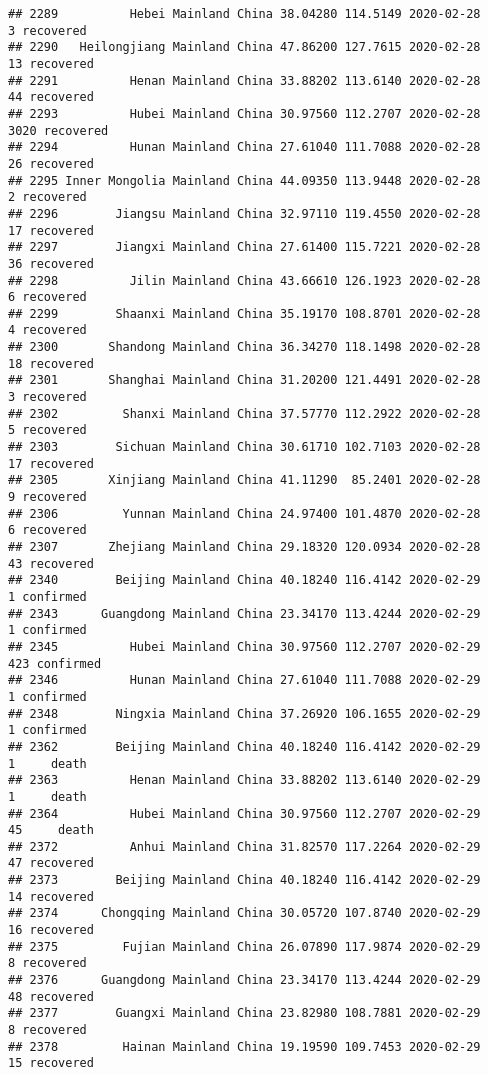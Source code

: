 \documentclass[
]{article}
\begin{document}
\begin{verbatim}
## 2289          Hebei Mainland China 38.04280 114.5149 2020-02-28     3 recovered
## 2290   Heilongjiang Mainland China 47.86200 127.7615 2020-02-28    13 recovered
## 2291          Henan Mainland China 33.88202 113.6140 2020-02-28    44 recovered
## 2293          Hubei Mainland China 30.97560 112.2707 2020-02-28  3020 recovered
## 2294          Hunan Mainland China 27.61040 111.7088 2020-02-28    26 recovered
## 2295 Inner Mongolia Mainland China 44.09350 113.9448 2020-02-28     2 recovered
## 2296        Jiangsu Mainland China 32.97110 119.4550 2020-02-28    17 recovered
## 2297        Jiangxi Mainland China 27.61400 115.7221 2020-02-28    36 recovered
## 2298          Jilin Mainland China 43.66610 126.1923 2020-02-28     6 recovered
## 2299        Shaanxi Mainland China 35.19170 108.8701 2020-02-28     4 recovered
## 2300       Shandong Mainland China 36.34270 118.1498 2020-02-28    18 recovered
## 2301       Shanghai Mainland China 31.20200 121.4491 2020-02-28     3 recovered
## 2302         Shanxi Mainland China 37.57770 112.2922 2020-02-28     5 recovered
## 2303        Sichuan Mainland China 30.61710 102.7103 2020-02-28    17 recovered
## 2305       Xinjiang Mainland China 41.11290  85.2401 2020-02-28     9 recovered
## 2306         Yunnan Mainland China 24.97400 101.4870 2020-02-28     6 recovered
## 2307       Zhejiang Mainland China 29.18320 120.0934 2020-02-28    43 recovered
## 2340        Beijing Mainland China 40.18240 116.4142 2020-02-29     1 confirmed
## 2343      Guangdong Mainland China 23.34170 113.4244 2020-02-29     1 confirmed
## 2345          Hubei Mainland China 30.97560 112.2707 2020-02-29   423 confirmed
## 2346          Hunan Mainland China 27.61040 111.7088 2020-02-29     1 confirmed
## 2348        Ningxia Mainland China 37.26920 106.1655 2020-02-29     1 confirmed
## 2362        Beijing Mainland China 40.18240 116.4142 2020-02-29     1     death
## 2363          Henan Mainland China 33.88202 113.6140 2020-02-29     1     death
## 2364          Hubei Mainland China 30.97560 112.2707 2020-02-29    45     death
## 2372          Anhui Mainland China 31.82570 117.2264 2020-02-29    47 recovered
## 2373        Beijing Mainland China 40.18240 116.4142 2020-02-29    14 recovered
## 2374      Chongqing Mainland China 30.05720 107.8740 2020-02-29    16 recovered
## 2375         Fujian Mainland China 26.07890 117.9874 2020-02-29     8 recovered
## 2376      Guangdong Mainland China 23.34170 113.4244 2020-02-29    48 recovered
## 2377        Guangxi Mainland China 23.82980 108.7881 2020-02-29     8 recovered
## 2378         Hainan Mainland China 19.19590 109.7453 2020-02-29    15 recovered

\end{verbatim}
\end{document}
